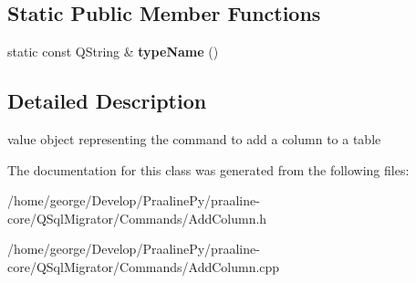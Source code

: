 \subsection*{Static Public Member Functions}
\begin{DoxyCompactItemize}
\item 
\mbox{\label{class_q_sql_migrator_1_1_commands_1_1_add_column_a09150d0d578297e1444215f6a8a459aa}} 
static const Q\+String \& {\bfseries type\+Name} ()
\end{DoxyCompactItemize}


\subsection{Detailed Description}
value object representing the command to add a column to a table 

The documentation for this class was generated from the following files\+:\begin{DoxyCompactItemize}
\item 
/home/george/\+Develop/\+Praaline\+Py/praaline-\/core/\+Q\+Sql\+Migrator/\+Commands/Add\+Column.\+h\item 
/home/george/\+Develop/\+Praaline\+Py/praaline-\/core/\+Q\+Sql\+Migrator/\+Commands/Add\+Column.\+cpp\end{DoxyCompactItemize}
